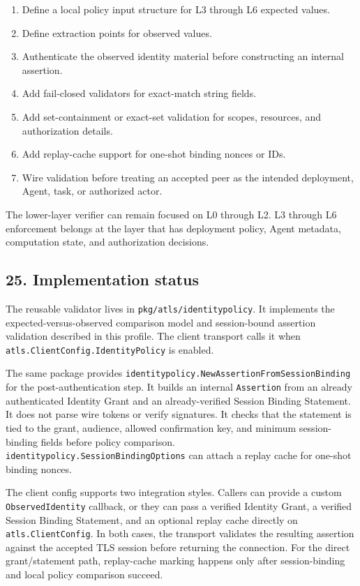 \documentclass[
]{article}
\providecommand{\tightlist}{%
  \setlength{\itemsep}{0pt}\setlength{\parskip}{0pt}}
\begin{document}
\begin{enumerate}
\def\labelenumi{\arabic{enumi}.}
\tightlist
\item
  Define a local policy input structure for L3 through L6 expected
  values.
\item
  Define extraction points for observed values.
\item
  Authenticate the observed identity material before constructing an
  internal assertion.
\item
  Add fail-closed validators for exact-match string fields.
\item
  Add set-containment or exact-set validation for scopes, resources, and
  authorization details.
\item
  Add replay-cache support for one-shot binding nonces or IDs.
\item
  Wire validation before treating an accepted peer as the intended
  deployment, Agent, task, or authorized actor.
\end{enumerate}

The lower-layer verifier can remain focused on L0 through L2. L3 through
L6 enforcement belongs at the layer that has deployment policy, Agent
metadata, computation state, and authorization decisions.

\subsection{25. Implementation status}\label{implementation-status}

The reusable validator lives in \texttt{pkg/atls/identitypolicy}. It
implements the expected-versus-observed comparison model and
session-bound assertion validation described in this profile. The client
transport calls it when \texttt{atls.ClientConfig.IdentityPolicy} is
enabled.

The same package provides
\texttt{identitypolicy.NewAssertionFromSessionBinding} for the
post-authentication step. It builds an internal \texttt{Assertion} from
an already authenticated Identity Grant and an already-verified Session
Binding Statement. It does not parse wire tokens or verify signatures.
It checks that the statement is tied to the grant, audience, allowed
confirmation key, and minimum session-binding fields before policy
comparison. \texttt{identitypolicy.SessionBindingOptions} can attach a
replay cache for one-shot binding nonces.

The client config supports two integration styles. Callers can provide a
custom \texttt{ObservedIdentity} callback, or they can pass a verified
Identity Grant, a verified Session Binding Statement, and an optional
replay cache directly on \texttt{atls.ClientConfig}. In both cases, the
transport validates the resulting assertion against the accepted TLS
session before returning the connection. For the direct grant/statement
path, replay-cache marking happens only after session-binding and local
policy comparison succeed.
\end{document}
